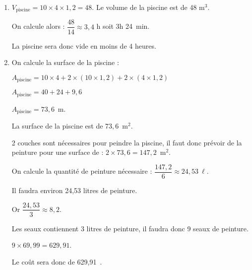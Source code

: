 \documentclass[10pt]{article}
\newcommand{\euro}{\eurologo{}}
\begin{document}
\begin{enumerate}
\item %
$V_{\text{piscine}} = 10 \times  4 \times 1,2 = 48$. Le volume de la piscine est de 48 m$^3$.

On calcule alors : $\dfrac{48}{14} \approx 3,4$ h soit 3h 24~min.

La piscine sera donc vide en moins de 4 heures.
\item %
On calcule la surface de la piscine :

$A_{\text{piscine}} = 10 \times 4 + 2 \times(10 \times1,2) + 2 \times(4 \times1,2)$

$A_{\text{piscine}} = 40 + 24 + 9,6$

$A_{\text{piscine}} = 73,6$~m.

La surface de la piscine est de $73,6$~m$^2$.

2 couches sont nécessaires pour peindre la piscine, il faut donc prévoir de la peinture pour
une surface de : $2 \times  73,6 = 147,2$~m$^2$.

On  calcule la quantité de peinture nécessaire : $\dfrac{147,2}{6} \approx 24,53~\ell$.

Il faudra environ 24,53 litres de peinture.

Or $\dfrac{24,53}{3} \approx  8,2$.

Les seaux contiennent 3 litres de peinture, il faudra donc 9 seaux de peinture.

$9 \times 69,99 = 629,91$.

Le coût sera donc de 629,91~\euro.
\end{enumerate}
\end{document}
